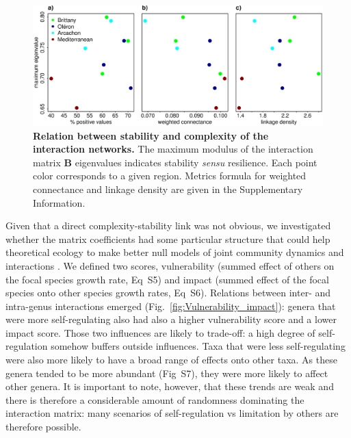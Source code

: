 \documentclass[10pt]{article}
\begin{document}
\begin{figure}[!h]
\centering
\includegraphics[width=\textwidth]{complexity_stability_MainFig_pencenjustB}
\caption{\textbf{Relation between stability and complexity of the interaction
networks.} The maximum modulus of the interaction matrix $\mathbf{B}$
eigenvalues indicates stability \emph{sensu} resilience. Each point
color corresponds to a given region. Metrics formula for weighted
connectance and linkage density are given in the Supplementary Information.}
\label{fig:Stability-community}
\end{figure}

Given that a direct complexity-stability link was not obvious, we
investigated whether the matrix coefficients had some particular structure
that could help theoretical ecology to make better null models of
joint community dynamics and interactions \citep{james_constructing_2015}.
We defined two scores, vulnerability (summed effect of others on
the focal species growth rate, Eq~S5) and impact (summed
effect of the focal species onto other species growth rates, Eq~S6). Relations between inter- and intra-genus interactions emerged
(Fig.~\ref{fig:Vulnerability_impact}): genera that were more self-regulating
also had also a higher vulnerability score and a lower impact score.
Those two influences are likely to trade-off: a high degree of self-regulation
somehow buffers outside influences. Taxa that were less self-regulating
were also more likely to have a broad range of effects onto other
taxa. As these genera tended to be more abundant (Fig~S7),
they were more likely to affect other genera. It is important to note,
however, that these trends are weak and there is therefore a considerable
amount of randomness dominating the interaction matrix: many scenarios
of self-regulation vs limitation by others are therefore possible.
\end{document}
